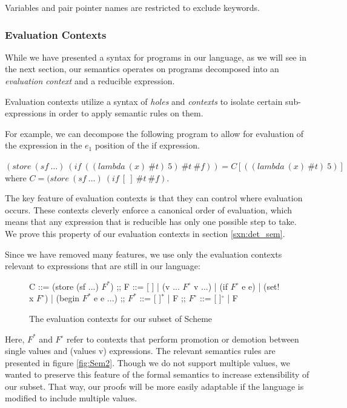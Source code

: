 Variables and pair pointer names are restricted to exclude keywords.

\subsubsection{Evaluation Contexts}
While we have presented a syntax for programs in our language, as we will see in the next section, our semantics operates on programs decomposed into an \textit{evaluation context} and a reducible expression.

Evaluation contexts utilize a syntax of \textit{holes} and \textit{contexts} to isolate certain sub-expressions in order to apply semantic rules on them.

For example, we can decompose the following program to allow for evaluation of the expression in the \textit{$e_1$} position of the if expression.

$(store\ (sf\ \dots)\ (if\ ((lambda\ (x)\ \#t)\ 5)\ \#t\ \#f)) = C[((lambda\ (x)\ \#t)\ 5)]$ where $C = (store\ (sf\ \dots)\ (if\ [\ ]\ \#t\ \#f)$.

The key feature of evaluation contexts is that they can control where evaluation occurs. These contexts cleverly enforce a canonical order of evaluation, which means that any expression that is reducible has only one possible step to take. We prove this property of our evaluation contexts in section \ref{sxn:det_sem}.

Since we have removed many features, we use only the evaluation contexts relevant to expressions that are still in our language:

\begin{figure}[h]
    \centering
\begin{bnfgrammar}
    C ::= (store (sf ...) $F^{*}$)
    ;;
    F ::= [ ]
    |   (v ... $F^{\circ}$ v ...)
    |   (if $F^{\circ}$ e e)
    |   (set! x $F^{\circ}$)
    |   (begin $F^{*}$ e e ...)
    ;;
    $F^{*}$ ::= [ ]$^{*}$
    |   F
    ;;
    $F^{\circ}$ ::= [ ]$^{\circ}$
    |   F
\end{bnfgrammar}
    \caption{The evaluation contexts for our subset of Scheme}
    \label{fig:eval_ctx}
\end{figure}

Here, $F^{*}$ and $F^{\circ}$ refer to contexts that perform promotion or demotion between single values and (values v) expressions. The relevant semantics rules are presented in figure \ref{fig:Sem2}. Though we do not support multiple values, we wanted to preserve this feature of the formal semantics to increase extensibility of our subset. That way, our proofs will be more easily adaptable if the language is modified to include multiple values.


